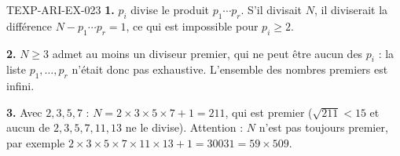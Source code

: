 \begin{corrige}{TEXP-ARI-EX-023}
\textbf{1.} $p_i$ divise le produit $p_1\cdots p_r$. S'il divisait $N$, il
diviserait la différence $N-p_1\cdots p_r=1$, ce qui est impossible pour
$p_i\geq2$.

\textbf{2.} $N\geq3$ admet au moins un diviseur premier, qui ne peut être
aucun des $p_i$ : la liste $p_1,\dots,p_r$ n'était donc pas exhaustive.
L'ensemble des nombres premiers est infini.

\textbf{3.} Avec $2,3,5,7$ : $N=2\times3\times5\times7+1=211$, qui est premier
($\sqrt{211}<15$ et aucun de $2,3,5,7,11,13$ ne le divise). Attention : $N$
n'est pas toujours premier, par exemple
$2\times3\times5\times7\times11\times13+1=30031=59\times509$.
\end{corrige}
